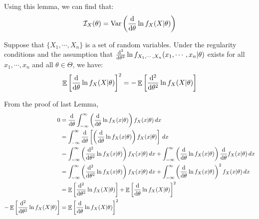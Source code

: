 \documentclass{huhtakm-template-book-v2}
\DeclareMathOperator{\E}{\mathbb{E}}
\DeclareMathOperator{\Var}{Var}
\begin{document}
\begin{rem}
	Using this lemma, we can find that:
	\begin{equation*}
		\mathcal{I}_{X}(\theta)=\Var\left(\odv*{}{\theta}\ln{f_{X}(X|\theta)}\right)
	\end{equation*}
\end{rem}
\begin{lem}
	\label{Chapter 2 (Lemma) Relationship between expectation of l'' and I}
	Suppose that $\{X_{1},\cdots,X_{n}\}$ is a set of random variables. Under the regularity conditions and the assumption that $\odv*[order={2}]{}{\theta}\ln{f_{X_{1},\cdots,X_{n}}(x_{1},\cdots,x_{n}|\theta)}$ exists for all $x_{1},\cdots,x_{n}$ and all $\theta\in\Theta$, we have:
	\begin{equation*}
		\E\left[\odv*{}{\theta}\ln{f_{X}(X|\theta)}\right]^{2}=-\E\left[\odv*[order={2}]{}{\theta}\ln{f_{X}(X|\theta)}\right]
	\end{equation*}
\end{lem}
\begin{proofing}
	From the proof of last Lemma,
	\begin{align*}
		0&=\odv*{}{\theta}\intinfty\left(\odv*{}{\theta}\ln{f_{X}(x|\theta)}\right)f_{X}(x|\theta)\,dx\\
		&=\intinfty\odv*{}{\theta}\left[\left(\odv*{}{\theta}\ln{f_{X}(x|\theta)}\right)f_{X}(x|\theta)\right]\,dx\\
		&=\intinfty\left(\odv*[order=2]{}{\theta}\ln{f_{X}(x|\theta)}\right)f_{X}(x|\theta)\,dx+\intinfty\left(\odv*{}{\theta}\ln{f_{X}(x|\theta)}\right)\odv*{}{\theta}f_{X}(x|\theta)\,dx\\
		&=\intinfty\left(\odv*[order=2]{}{\theta}\ln{f_{X}(x|\theta)}\right)f_{X}(x|\theta)\,dx+\intinfty\left(\odv*{}{\theta}\ln{f_{X}(x|\theta)}\right)^{2}f_{X}(x|\theta)\,dx\\
		&=\E\left[\odv*[order={2}]{}{\theta}\ln{f_{X}(X|\theta)}\right]+\E\left[\odv*{}{\theta}\ln{f_{X}(X|\theta)}\right]^{2}\\
		-\E\left[\odv*[order={2}]{}{\theta}\ln{f_{X}(X|\theta)}\right]&=\E\left[\odv*{}{\theta}\ln{f_{X}(X|\theta)}\right]^{2}
	\end{align*}
\end{proofing}
\end{document}
